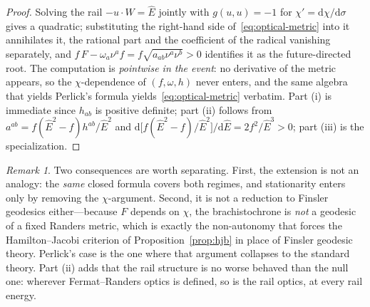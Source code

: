 \documentclass[12pt]{iopart}
\newcommand{\Ehat}{\hat E}
\newcommand{\dd}{\mathrm{d}}
\theoremstyle{plain}
\theoremstyle{definition}
\theoremstyle{plain}
\theoremstyle{remark}
\newtheorem*{remark}{Remark}
\begin{document}
\begin{proof}
Solving the rail $-u\cdot W=\Ehat$ jointly with $g(u,u)=-1$ for $\chi'=\dd\chi/\dd\sigma$
gives a quadratic; substituting the right-hand side of~\eqref{eq:optical-metric} into it
annihilates it, the rational part and the coefficient of the radical vanishing separately,
and $f\,F-\omega_a\nu^a f=f\sqrt{a_{ab}\nu^a\nu^b}>0$ identifies it as the
future-directed root. The computation is \emph{pointwise in the event}: no derivative of
the metric appears, so the $\chi$-dependence of $(f,\omega,h)$ never enters, and the same
algebra that yields Perlick's formula yields~\eqref{eq:optical-metric} verbatim. Part (i)
is immediate since $h_{ab}$ is positive definite; part (ii) follows from
$a^{ab}=f(\Ehat^2-f)h^{ab}/\Ehat^2$ and
$\dd\big[f(\Ehat^2-f)/\Ehat^2\big]/\dd\Ehat=2f^2/\Ehat^3>0$; part (iii) is the
specialization.
\end{proof}

\begin{remark}
Two consequences are worth separating. First, the extension is not an analogy: the
\emph{same} closed formula covers both regimes, and stationarity enters only by removing
the $\chi$-argument. Second, it is not a reduction to Finsler geodesics either---because
$F$ depends on $\chi$, the brachistochrone is \emph{not} a geodesic of a fixed Randers
metric, which is exactly the non-autonomy that forces the Hamilton--Jacobi criterion of
Proposition~\ref{prop:hjb} in place of Finsler geodesic theory. Perlick's case is the one
where that argument collapses to the standard theory. Part (ii) adds that the rail
structure is no worse behaved than the null one: wherever Fermat--Randers optics is
defined, so is the rail optics, at every rail energy.
\end{remark}
\end{document}
